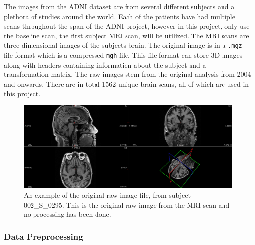 \documentclass[11pt, fleqn, titlepage]{article}
\newcommand{\1}[1]{\mathds{1}\left[#1\right]}
\begin{document}
The images from the ADNI dataset are from several different subjects and a plethora of studies around the world.
Each of the patients have had multiple scans throughout the span of the ADNI project, however in this project, only use the baseline scan, the first subject MRI scan, will be utilized. 
The MRI scans are three dimensional images of the subjects brain. 
The original image is in a \texttt{.mgz} file format which is a compressed \texttt{mgh} file. 
This file format can store 3D-images along with headers containing information about the subject and a transformation matrix.
The raw images stem from the original analysis from 2004 and onwards. There are in total 1562 %
unique brain scans, all of which are used in this project.

\begin{figure}[H]
	\centering
	\includegraphics[width=0.95\linewidth]{mymans2}
	\caption{An example of the original raw image file, from subject 002\_S\_0295. This is the original raw image from the MRI scan and no processing has been done.}
	\label{fig:screenshot001}
\end{figure}

\subsubsection{Data Preprocessing}
\end{document}
